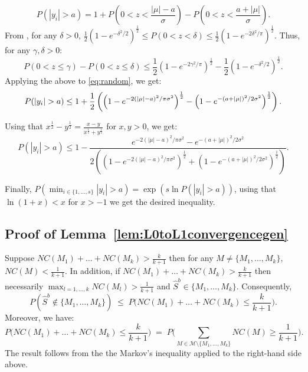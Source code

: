 \documentclass[aos]{imsart}
\theoremstyle{plain}
\newcommand{\M}{\mathcal{M}}
\begin{document}
\begin{equation}\label{eq:random}
    P(|y_i|>a) = 1+P(0<z<\frac{|\mu|-a}{\sigma})-P(0<z<\frac{a+|\mu|}{\sigma}).
\end{equation}
From \cite{chu}, for any $\delta>0$, $\frac{1}{2}\left(1-e^{-\delta^2/2}\right)^{\frac{1}{2}}\leq P(0 <z < \delta)\leq \frac{1}{2}\left(1-e^{-2\delta^2/\pi}\right)^{\frac{1}{2}}$. Thus, for any $\gamma,\delta>0$:
$$ P(0<z \leq \gamma)-P(0<z \leq \delta)\leq
\frac{1}{2}\left(1-e^{-2\gamma^2/\pi}\right)^{\frac{1}{2}}-\frac{1}{2}\left(1-e^{-\delta^2/2}\right)^{\frac{1}{2}}.$$
Applying the above to \eqref{eq:random}, we get:
$$P(|y_i|>a) \leq 
1+ \frac{1}{2}\left(\left(1-e^{-2(|\mu|-a)^2/\pi\sigma^2}\right)^{\frac{1}{2}}-\left(1-e^{-(a+|\mu|)^2/2\sigma^2}\right)^{\frac{1}{2}}\right).\\$$

Using that $x^{\frac{1}{2}}-y^{\frac{1}{2}}=\frac{x-y}{x^{\frac{1}{2}}+y^{\frac{1}{2}}}$ for $x,y>0$, we get:
$$P(|y_i|>a) \leq 1- \frac{e^{-2(|\mu|-a)^2/\pi\sigma^2}-e^{-(a+|\mu|)^2/2\sigma^2}}{2\left(\left(1-e^{-2(|\mu|-a)^2/\pi\sigma^2}\right)^{\frac{1}{2}}+\left(1-e^{-(a+|\mu|)^2/2\sigma^2}\right)^{\frac{1}{2}}\right)}.$$

Finally, $P(\min_{i\in\{1,\ldots,s\}}|y_i|>a)=\exp\left(s\ln{P(|y_i|>a)}\right)$, using that $\ln\left(1+ x \right)< x$ for $x>-1$ we get the desired inequality.

\subsection{Proof of Lemma~\ref{lem:L0toL1convergencegen}}
Suppose $NC(M_1)+\ldots+NC(M_k)>\frac{k}{k+1}$ then for any $M\neq \{M_1,\ldots,M_k\}$, $NC(M)<\frac{1}{k+1}$. In addition, if $NC(M_1)+\ldots+NC(M_k)>\frac{k}{k+1}$ then necessarily $\max_{l=1,\ldots,k}NC(M_l)> \frac{1}{k+1}$ and $\hat{S}^{b}\in \{M_1,\ldots,M_k\}$. Consequently, 
$$
P(\hat{S}^b\not\in \{M_1,\ldots,M_k\})\; \leq\; P\Big(NC(M_1)+\ldots+NC(M_k)\leq\frac{k}{k+1}\Big).$$
Moreover, we have:
$$P\Big(NC(M_1)+\ldots+NC(M_k)\leq\frac{k}{k+1}\Big)\;=\;P\Big(\sum_{M \in \M\setminus \{M_1,\ldots,M_k\}} NC(M)\geq \frac{1}{k+1}\Big).$$
The result follows from the the Markov's inequality applied to the right-hand side above.
\end{document}
